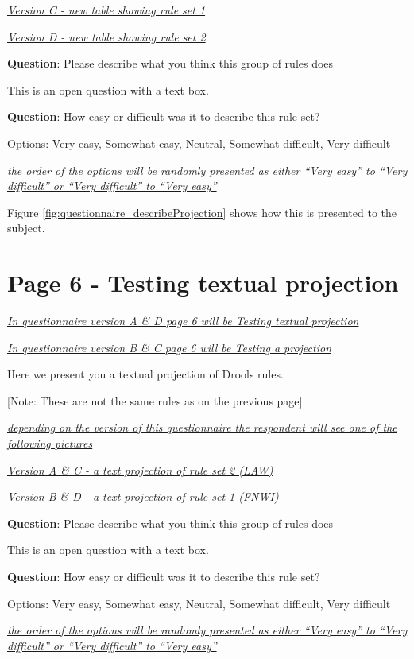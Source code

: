 \emph{\underline{Version C - new table showing rule set 1}}

\emph{\underline{Version D - new table showing rule set 2}}

\textbf{Question}: Please describe what you think this group of rules does

This is an open question with a text box.

\textbf{Question}: How easy or difficult was it to describe this rule set?

Options: Very easy, Somewhat easy, Neutral, Somewhat difficult, Very difficult 

\emph{\underline{the order of the options will be randomly presented as either ``Very easy'' to ``Very difficult'' or ``Very difficult'' to ``Very easy''}}

Figure \ref{fig:questionnaire_describeProjection} shows how this is presented to the subject.

\section{Page 6 - Testing textual projection}
\emph{\underline{In questionnaire version A \& D page 6 will be Testing textual projection}}

\emph{\underline{In questionnaire version B \& C page 6 will be Testing a projection}}

Here we present you a textual projection of Drools rules.

[Note: These are not the same rules as on the previous page]

\emph{\underline{depending on the version of this questionnaire the respondent will see one of the following pictures}}

\emph{\underline{Version A \& C - a text projection of rule set 2 (LAW)}}

\emph{\underline{Version B \& D - a text projection of rule set 1 (FNWI)}}

\textbf{Question}: Please describe what you think this group of rules does

This is an open question with a text box.

\textbf{Question}: How easy or difficult was it to describe this rule set?

Options: Very easy, Somewhat easy, Neutral, Somewhat difficult, Very difficult 

\emph{\underline{the order of the options will be randomly presented as either ``Very easy'' to ``Very difficult'' or ``Very difficult'' to ``Very easy''}}

